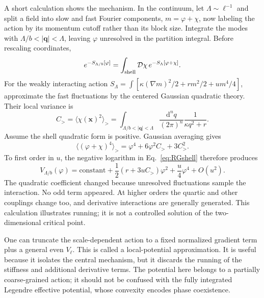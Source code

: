 \documentclass[11pt]{article}
\newcommand{\dd}{\mathrm{d}}
\begin{document}
A short calculation shows the mechanism. In the continuum, let
\(\Lambda\sim\ell^{-1}\) and split a field into slow and fast Fourier
components, \(m=\varphi+\chi\), now labeling the action by its momentum
cutoff rather than its block size. Integrate the modes with
\(\Lambda/b<|\bm q|<\Lambda\), leaving \(\varphi\) unresolved in the
partition integral. Before rescaling coordinates,
\begin{equation}
e^{-S_{\Lambda/b}[\varphi]}
=\int_{\rm shell}\mathcal D\chi\,e^{-S_\Lambda[\varphi+\chi]}.
\label{eq:RGshell}
\end{equation}
For the weakly interacting action
\(S_\Lambda=\int[\kappa(\nabla m)^2/2+rm^2/2+um^4/4]\), approximate
the fast fluctuations by the centered Gaussian quadratic theory. Their
local variance is
\begin{equation}
C_>=\langle\chi(\bm x)^2\rangle_>
=\int_{\Lambda/b<|\bm q|<\Lambda}
\frac{\dd^n q}{(2\pi)^n}\frac{1}{\kappa q^2+r}.
\label{eq:shellVariance}
\end{equation}
Assume the shell quadratic form is positive. Gaussian averaging gives
\begin{equation}
\langle(\varphi+\chi)^4\rangle_>
=\varphi^4+6\varphi^2C_>+3C_>^2.
\end{equation}
To first order in \(u\), the negative logarithm in
Eq.~\eqref{eq:RGshell} therefore produces
\begin{equation}
V_{\Lambda/b}(\varphi)
=\text{constant}+\frac12(r+3uC_>)\varphi^2
+\frac u4\varphi^4+O(u^2).
\label{eq:massRunning}
\end{equation}
The quadratic coefficient changed because unresolved fluctuations sample
the interaction. No odd term appeared. At higher orders the quartic and
other couplings change too, and derivative interactions are generally
generated. This calculation illustrates running; it is not a controlled
solution of the two-dimensional critical point.

\begin{remarkbox}
One can truncate the scale-dependent action to a fixed normalized gradient
term plus a general even \(V_\ell\). This is called a local-potential
approximation. It is useful because it isolates the central mechanism, but
it discards the running of the stiffness and additional derivative terms.
The potential here belongs to a partially coarse-grained action; it should
not be confused with the fully integrated Legendre effective potential,
whose convexity encodes phase coexistence.
\end{remarkbox}
\end{document}
